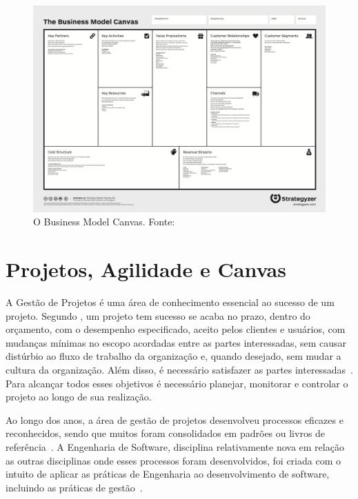 \documentclass[fontsize=12pt, a4paper,pagesize=auto,toc=listof, ,twoside,chapterprefix=false,appendixprefix=true,open=right]{scrbook}
\newcommand{\othersize}{0.7\linewidth}
\begin{document}
\begin{figure}
    \centering
    \includegraphics[width=\othersize]{imagens/BMC.png}
    \caption{O Business Model Canvas. Fonte: \citet{osterwalder2010business}}
    \label{fig:bmc}
\end{figure}


\chapter{Projetos, Agilidade e Canvas}

A Gestão de Projetos é uma área de conhecimento essencial ao sucesso de um projeto. Segundo \citet{kerzner:12ed}, um projeto tem sucesso se
acaba no prazo, dentro do orçamento, com o desempenho especificado, aceito pelos clientes e usuários, com mudanças mínimas no escopo acordadas entre as partes interessadas, sem causar distúrbio ao fluxo de trabalho da organização e, quando desejado, sem mudar a cultura da organização. Além disso, é necessário satisfazer as partes interessadas~\citep{pmbok:6}. Para alcançar todos esses objetivos é necessário planejar, monitorar e controlar o projeto ao longo de sua realização.

Ao longo dos anos, a área de gestão de projetos desenvolveu processos eficazes e reconhecidos, sendo que muitos foram consolidados em padrões ou livros de referência~\citep{pmbok:6,kerzner:12ed}. A Engenharia de Software, disciplina relativamente nova em relação as outras disciplinas onde esses processos foram desenvolvidos, foi criada com o intuito de aplicar as práticas de Engenharia ao desenvolvimento de software, incluindo as práticas de gestão~\citep{naur:randell:1968,pressman:2019,ieee_computer_society_guide_2014}.
\end{document}
